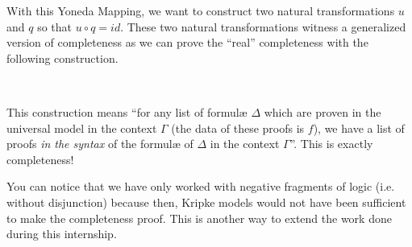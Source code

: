 \documentclass[10pt,a4paper]{article}
\begin{document}
			With this Yoneda Mapping, we want to construct two natural transformations $u$ and $q$ so that $u \circ q = id$. These two natural transformations witness a generalized version of completeness as we can prove the \enquote{real} completeness with the following construction.
			
			\begin{center}
			\begin{code}
				\>[4]\AgdaSpace{}%
				\AgdaSymbol{:}\AgdaSpace{}%
				\AgdaSymbol{\{}\AgdaSpace{}%
				\AgdaSpace{}%
				\AgdaSymbol{:}\AgdaSpace{}%
				\AgdaSymbol{\}}\AgdaSpace{}%
				\AgdaSpace{}%
				\AgdaSymbol{(\{}\AgdaSpace{}%
				\AgdaSymbol{:}\AgdaSpace{}%
				\AgdaSymbol{\}}\AgdaSpace{}%
				\AgdaSpace{}%
				\AgdaSpace{}%
				\AgdaSpace{}%
				\AgdaSpace{}%
				\AgdaSpace{}%
				\AgdaSpace{}%
				\AgdaSpace{}%
				\AgdaSpace{}%
				\AgdaSpace{}%
				\AgdaSpace{}%
				\AgdaSymbol{)}%
				\>[99]\AgdaSpace{}%
				\AgdaSpace{}%
				\AgdaSpace{}%
				\<%
				\\
				\>[4]\AgdaSpace{}%
				\AgdaSymbol{\{}\AgdaSymbol{\}}\AgdaSpace{}%
				\AgdaSymbol{\{}\AgdaSymbol{\}}\AgdaSpace{}%
				\AgdaSpace{}%
				\AgdaSymbol{=}\AgdaSpace{}%
				\AgdaSpace{}%
				\AgdaSpace{}%
				\AgdaSpace{}%
				\AgdaSymbol{(}\AgdaSpace{}%
				\AgdaSymbol{\{}\AgdaSymbol{\}}\AgdaSpace{}%
				\AgdaSymbol{(}\AgdaSpace{}%
				\AgdaSpace{}%
				\AgdaSpace{}%
				\AgdaSymbol{))}\<%
			\end{code}
			\end{center}
		
		This construction means \enquote{for any list of formulæ $\Delta$ which are proven in the universal model in the context $\Gamma$ (the data of these proofs is $f$), we have a list of proofs \emph{in the syntax} of the formulæ of $\Delta$ in the context $\Gamma$}. This is exactly completeness!
		
		You can notice that we have only worked with negative fragments of logic (i.e. without disjunction) because then, Kripke models would not have been sufficient to make the completeness proof. This is another way to extend the work done during this internship.
		
\end{document}
